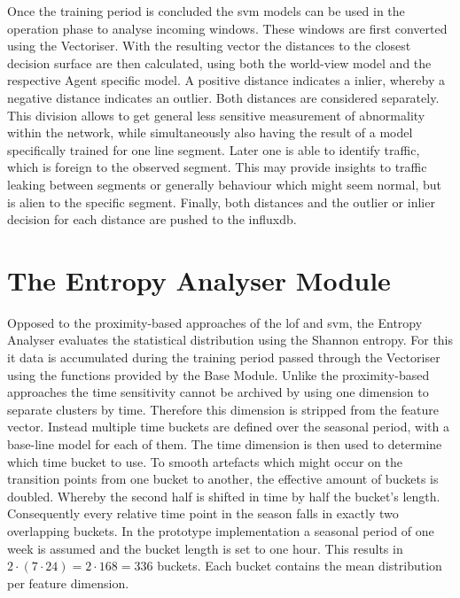Once the training period is concluded the \gls{svm} models can be used in the operation phase to analyse incoming windows.
These windows are first converted using the Vectoriser. With the resulting vector the distances to the closest decision surface are then calculated, using both the world-view model and the respective Agent specific model.
A positive distance indicates a inlier, whereby a negative distance indicates an outlier.
Both distances are considered separately. This division allows to get general less sensitive measurement of abnormality within the network, while simultaneously also having the result of a model specifically trained for one line segment. Later one is able to identify traffic, which is foreign to the observed segment. This may provide insights to traffic leaking between segments or generally behaviour which might seem normal, but is alien to the specific segment.
Finally, both distances and the outlier or inlier decision for each distance are pushed to the \gls{influxdb}.

\section{The Entropy Analyser Module}
\label{sec:impl:entropy}

Opposed to the proximity-based approaches of the \gls{lof} and \gls{svm}, the Entropy Analyser evaluates the statistical distribution using the Shannon entropy. \parencite[cf.][]{Shannon1948}
For this it data is accumulated during the training period passed through the Vectoriser using the functions provided by the Base Module.
Unlike the proximity-based approaches the time sensitivity cannot be archived by using one dimension to separate clusters by time. Therefore this dimension is stripped from the feature vector. Instead multiple time buckets are defined over the seasonal period, with a base-line model for each of them. The time dimension is then used to determine which time bucket to use.
To smooth artefacts which might occur on the transition points from one bucket to another, the effective amount of buckets is doubled. Whereby the second half is shifted in time by half the bucket's length.
Consequently every relative time point in the season falls in exactly two overlapping buckets.
In the prototype implementation a seasonal period of one week is assumed and the bucket length is set to one hour. This results in $2 \cdot (7 \cdot 24) = 2 \cdot 168 = 336$ buckets. Each bucket contains the mean distribution per feature dimension.

